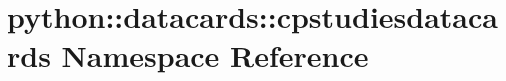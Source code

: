 \hypertarget{namespacepython_1_1datacards_1_1cpstudiesdatacards}{
\section{python::datacards::cpstudiesdatacards Namespace Reference}
\label{namespacepython_1_1datacards_1_1cpstudiesdatacards}
}
